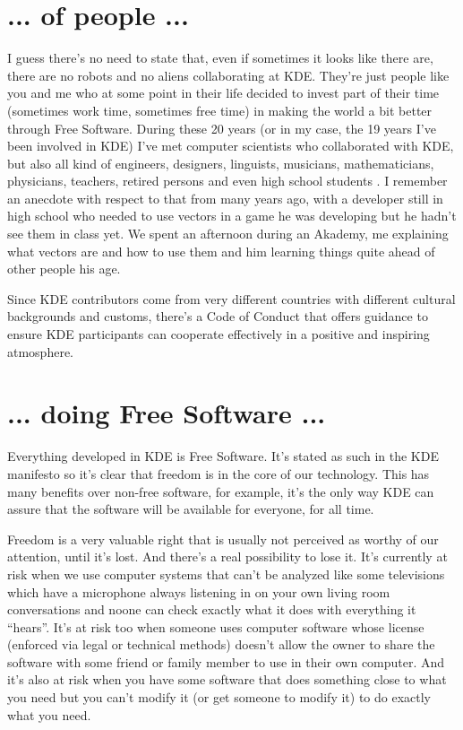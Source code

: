 \section*{... of people ...}
I guess there's no need to state that, even if sometimes it looks like there are, there are no robots and no aliens collaborating at KDE. They're just people like you and me who at some point in their life decided to invest part of their time (sometimes work time, sometimes free time) in making the world a bit better through Free Software. During these 20 years (or in my case, the 19 years I've been involved in KDE) I've met computer scientists who collaborated with KDE, but also all kind of engineers, designers, linguists, musicians, mathematicians, physicians, teachers, retired persons and even high school students . I remember an anecdote with respect to that from many years ago, with a developer still in high school who needed to use vectors in a game he was developing but he hadn't see them in class yet. We spent an afternoon during an Akademy, me explaining what vectors are and how to use them and him learning things quite ahead of other people his age.

Since KDE contributors come from very different countries with different cultural backgrounds and customs, there's a Code of Conduct that offers guidance to ensure KDE participants can cooperate effectively in a positive and inspiring atmosphere.

\section*{... doing Free Software ...}
Everything developed in KDE is Free Software. It's stated as such in the KDE manifesto so it's clear that freedom is in the core of our technology. This has many benefits over non-free software, for example, it's the only way KDE can assure that the software will be available for everyone, for all time. 

Freedom is a very valuable right that is usually not perceived as worthy of our attention, until it's lost. And there's a real possibility to lose it. It's currently at risk when we use computer systems that can't be analyzed like some televisions which have a microphone always listening in on your own living room conversations and noone can check exactly what it does with everything it “hears”. It's at risk too when someone uses computer software whose license (enforced via legal or technical methods) doesn't allow the owner to share the software with some friend or family member to use in their own computer. And it's also at risk when you have some software that does something close to what you need but you can't modify it (or get someone to modify it) to do exactly what you need.

